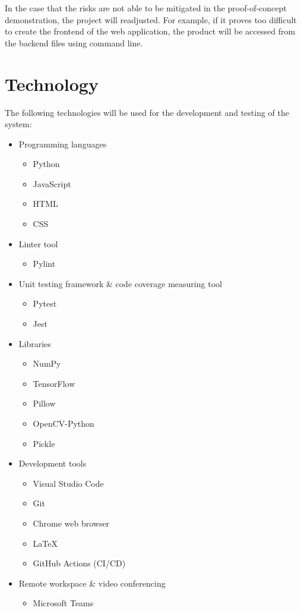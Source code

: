 \documentclass{article}
\begin{document}
In the case that the risks are not able to be mitigated in the proof-of-concept demonstration, the project will readjusted. For example, if it proves too difficult to create the frontend of the web application, the product will be accessed from the backend files using command line.

\section{Technology}

The following technologies will be used for the development and testing of the system:
\begin{itemize}
	\item Programming languages
	\begin{itemize}
		\item Python
		\item JavaScript
		\item HTML
		\item CSS
	\end{itemize}
	\item Linter tool
	\begin{itemize}
		\item Pylint
	\end{itemize}
	\item Unit testing framework \& code coverage measuring tool
	\begin{itemize}
		\item Pytest
		\item Jest
	\end{itemize}
	\item Libraries
	\begin{itemize}
		\item NumPy
		\item TensorFlow
		\item Pillow
		\item OpenCV-Python
		\item Pickle
	\end{itemize}
	\item Development tools
	\begin{itemize}
		\item Visual Studio Code
		\item Git
		\item Chrome web browser
		\item \LaTeX
		\item GitHub Actions (CI/CD)
	\end{itemize}
	\item Remote workspace \& video conferencing
	\begin{itemize}
		\item Microsoft Teams
	\end{itemize}
\end{itemize}
\end{document}
